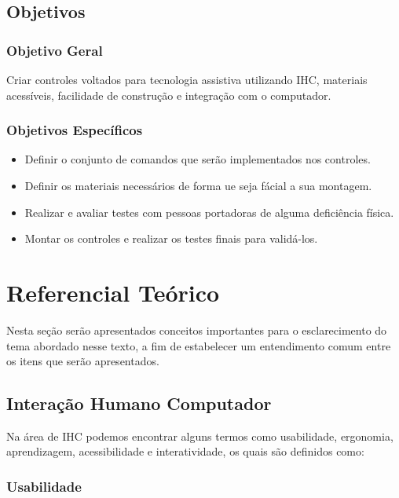 \documentclass[
	12pt,			%
	openright,		%
	oneside,			%
	a4paper,			%
	chapter=TITLE,		%
	english,			%
	brazil,			%
	]{abntex2}
\begin{document}
\section{Objetivos}
\label{obj}

\subsection{Objetivo Geral}
Criar controles voltados para tecnologia assistiva utilizando IHC, materiais acessíveis, facilidade de construção e integração com o computador.

\subsection{Objetivos Específicos}
\begin{itemize}
	\item Definir o conjunto de comandos que serão implementados nos controles.
	\item Definir os materiais necessários de forma ue seja fácial a sua montagem.
	\item Realizar e avaliar testes com pessoas portadoras de alguma deficiência física.
	\item Montar os controles e realizar os testes finais para validá-los.
\end{itemize}


\chapter{Referencial Teórico}
\label{refteo}

Nesta seção serão apresentados conceitos importantes para o esclarecimento do tema abordado nesse texto, a fim de estabelecer um entendimento comum entre os itens que serão apresentados.

\section{Interação Humano Computador}

Na área de IHC podemos encontrar alguns termos como usabilidade, ergonomia, aprendizagem, acessibilidade e interatividade, os quais são definidos como:

\subsection{Usabilidade}
\end{document}

